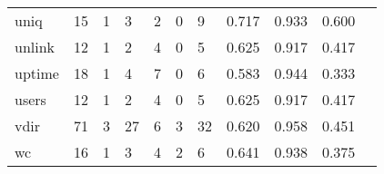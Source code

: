 \begin{longtable}{lp{1.20cm}p{1.20cm}p{1.20cm}p{1.20cm}p{1.20cm}p{1.20cm}p{1.20cm}p{1.20cm}p{1.20cm}p{1.20cm}}
uniq      &                                    15 &                                                  1 &                                                  3 &                                                  2 &                                                  0 &                                                  9 &                                         0.717 &                                              0.933 &                                              0.600 \\
unlink    &                                    12 &                                                  1 &                                                  2 &                                                  4 &                                                  0 &                                                  5 &                                         0.625 &                                              0.917 &                                              0.417 \\
uptime    &                                    18 &                                                  1 &                                                  4 &                                                  7 &                                                  0 &                                                  6 &                                         0.583 &                                              0.944 &                                              0.333 \\
users     &                                    12 &                                                  1 &                                                  2 &                                                  4 &                                                  0 &                                                  5 &                                         0.625 &                                              0.917 &                                              0.417 \\
vdir      &                                    71 &                                                  3 &                                                 27 &                                                  6 &                                                  3 &                                                 32 &                                         0.620 &                                              0.958 &                                              0.451 \\
wc        &                                    16 &                                                  1 &                                                  3 &                                                  4 &                                                  2 &                                                  6 &                                         0.641 &                                              0.938 &                                              0.375 \\

\end{longtable}
